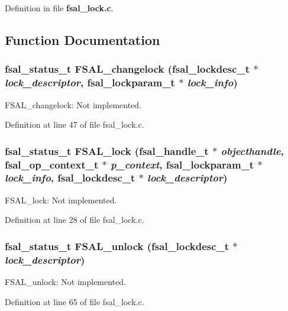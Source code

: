 Definition in file {\bf fsal\_\-lock.c}.

\subsection{Function Documentation}
\subsubsection[{FSAL\_\-changelock}]{\setlength{\rightskip}{0pt plus 5cm}fsal\_\-status\_\-t FSAL\_\-changelock (fsal\_\-lockdesc\_\-t $\ast$ {\em lock\_\-descriptor}, \/  fsal\_\-lockparam\_\-t $\ast$ {\em lock\_\-info})}\label{fsal__lock_8c_d7440144c01257bb00d1a357760739ec}


FSAL\_\-changelock: Not implemented. 

Definition at line 47 of file fsal\_\-lock.c.
\subsubsection[{FSAL\_\-lock}]{\setlength{\rightskip}{0pt plus 5cm}fsal\_\-status\_\-t FSAL\_\-lock (fsal\_\-handle\_\-t $\ast$ {\em objecthandle}, \/  fsal\_\-op\_\-context\_\-t $\ast$ {\em p\_\-context}, \/  fsal\_\-lockparam\_\-t $\ast$ {\em lock\_\-info}, \/  fsal\_\-lockdesc\_\-t $\ast$ {\em lock\_\-descriptor})}\label{fsal__lock_8c_c3ed7385fa0551a1f1e6e82cae20f971}


FSAL\_\-lock: Not implemented. 

Definition at line 28 of file fsal\_\-lock.c.
\subsubsection[{FSAL\_\-unlock}]{\setlength{\rightskip}{0pt plus 5cm}fsal\_\-status\_\-t FSAL\_\-unlock (fsal\_\-lockdesc\_\-t $\ast$ {\em lock\_\-descriptor})}\label{fsal__lock_8c_842a0ed5dbbda6ba1febd76ed2c32b6d}


FSAL\_\-unlock: Not implemented. 

Definition at line 65 of file fsal\_\-lock.c.